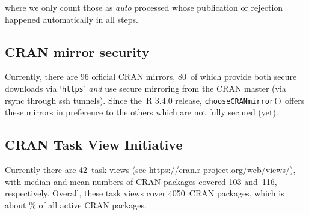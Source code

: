 \noindent where we only count those as \emph{auto} processed whose publication or
rejection happened automatically in all steps.

\hypertarget{cran-mirror-security}{%
\subsection{CRAN mirror security}\label{cran-mirror-security}}

Currently, there are 96 official CRAN mirrors,
80~of which provide both
secure downloads via `\texttt{https}' \emph{and} use secure mirroring from the CRAN master
(via rsync through ssh tunnels). Since the~R 3.4.0 release, \texttt{chooseCRANmirror()}
offers these mirrors in preference to the others which are not fully secured (yet).

\hypertarget{cran-task-view-initiative}{%
\subsection{CRAN Task View Initiative}\label{cran-task-view-initiative}}

Currently there are 42~task views (see \url{https://cran.r-project.org/web/views/}),
with median and mean numbers of CRAN packages covered
103 and~116, respectively.
Overall, these task views cover 4050~CRAN packages,
which is about \% of all active CRAN packages.


\address{%
Kurt Hornik\\
WU Wirtschaftsuniversität Wien\\%
Austria\\
%
%
\textit{ORCiD: \href{https://orcid.org/0000-0003-4198-9911}{0000-0003-4198-9911}}\\%
\href{mailto:Kurt.Hornik@R-project.org}{\nolinkurl{Kurt.Hornik@R-project.org}}%
}

\address{%
Uwe Ligges\\
TU Dortmund\\%
Germany\\
%
%
\textit{ORCiD: \href{https://orcid.org/0000-0001-5875-6167}{0000-0001-5875-6167}}\\%
\href{mailto:Uwe.Ligges@R-project.org}{\nolinkurl{Uwe.Ligges@R-project.org}}%
}

\address{%
Achim Zeileis\\
Universität Innsbruck\\%
Austria\\
%
%
\textit{ORCiD: \href{https://orcid.org/0000-0003-0918-3766}{0000-0003-0918-3766}}\\%
\href{mailto:Achim.Zeileis@R-project.org}{\nolinkurl{Achim.Zeileis@R-project.org}}%
}
